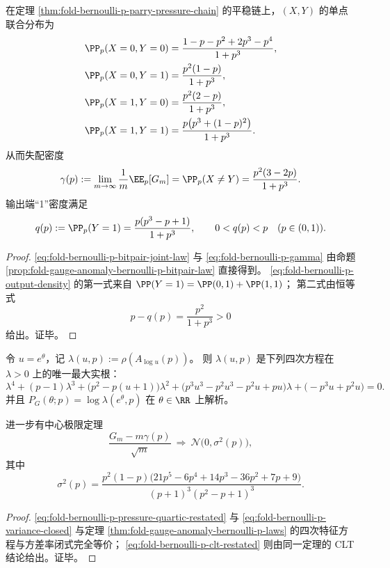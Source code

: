 \begin{theorem}\label{thm:fold-bernoulli-p-bitpair-gamma-q-closed}
在定理 \ref{thm:fold-bernoulli-p-parry-pressure-chain} 的平稳链上，\((X,Y)\) 的单点联合分布为
\begin{align}
\PP_p(X=0,Y=0)&=\frac{1-p-p^2+2p^3-p^4}{1+p^3},\nonumber\\
\PP_p(X=0,Y=1)&=\frac{p^2(1-p)}{1+p^3},\nonumber\\
\PP_p(X=1,Y=0)&=\frac{p^2(2-p)}{1+p^3},\label{eq:fold-bernoulli-p-bitpair-joint-law}\\
\PP_p(X=1,Y=1)&=\frac{p\bigl(p^3+(1-p)^2\bigr)}{1+p^3}. \nonumber
\end{align}
从而失配密度
\begin{equation}\label{eq:fold-bernoulli-p-gamma}
\gamma(p):=\lim_{m\to\infty}\frac1m\EE_p[G_m]
=\PP_p(X\neq Y)
=\frac{p^2(3-2p)}{1+p^3}.
\end{equation}
输出端“1”密度满足
\begin{equation}\label{eq:fold-bernoulli-p-output-density}
q(p):=\PP_p(Y=1)
=\frac{p(p^3-p+1)}{1+p^3},
\qquad
0<q(p)<p\quad(p\in(0,1)).
\end{equation}
\end{theorem}
\begin{proof}
\eqref{eq:fold-bernoulli-p-bitpair-joint-law} 与
\eqref{eq:fold-bernoulli-p-gamma}
由命题 \ref{prop:fold-gauge-anomaly-bernoulli-p-bitpair-law} 直接得到。
\eqref{eq:fold-bernoulli-p-output-density} 的第一式来自
\(
\PP(Y=1)=\PP(0,1)+\PP(1,1)
\)；
第二式由恒等式
\[
p-q(p)=\frac{p^2}{1+p^3}>0
\]
给出。证毕。
\end{proof}

\begin{theorem}\label{thm:fold-bernoulli-p-pressure-quartic-clt-variance}
令 \(u=e^\theta\)，记 \(\lambda(u,p):=\rho(A_{\log u}(p))\)。
则 \(\lambda(u,p)\) 是下列四次方程在 \(\lambda>0\) 上的唯一最大实根：
\begin{equation}\label{eq:fold-bernoulli-p-pressure-quartic-restated}
\lambda^4+(p-1)\lambda^3+\bigl(p^2-p(u+1)\bigr)\lambda^2
+\bigl(p^3u^3-p^2u^3-p^2u+pu\bigr)\lambda
+\bigl(-p^3u+p^2u\bigr)=0.
\end{equation}
并且 \(P_G(\theta;p)=\log\lambda(e^\theta,p)\) 在 \(\theta\in\RR\) 上解析。

进一步有中心极限定理
\begin{equation}\label{eq:fold-bernoulli-p-clt-restated}
\frac{G_m-m\gamma(p)}{\sqrt m}\ \Rightarrow\ \mathcal N\!\bigl(0,\sigma^2(p)\bigr),
\end{equation}
其中
\begin{equation}\label{eq:fold-bernoulli-p-variance-closed}
\sigma^2(p)=
\frac{p^2(1-p)\bigl(21 p^5-6 p^4+14 p^3-36 p^2+7 p+9\bigr)}
{(p+1)^3(p^2-p+1)^3}.
\end{equation}
\end{theorem}
\begin{proof}
\eqref{eq:fold-bernoulli-p-pressure-quartic-restated} 与
\eqref{eq:fold-bernoulli-p-variance-closed}
与定理 \ref{thm:fold-gauge-anomaly-bernoulli-p-laws} 的四次特征方程与方差率闭式完全等价；
\eqref{eq:fold-bernoulli-p-clt-restated} 则由同一定理的 CLT 结论给出。证毕。
\end{proof}

